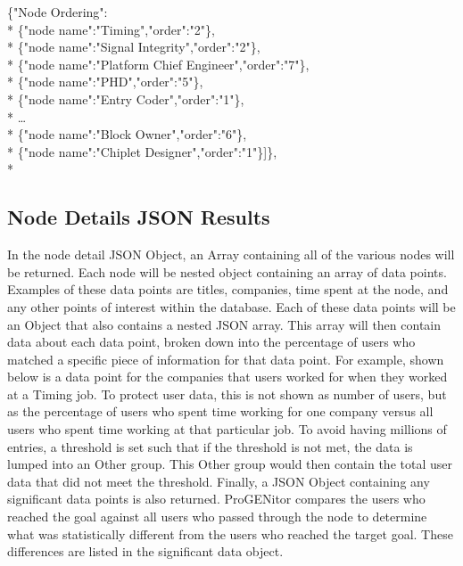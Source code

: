 \noindent \{"Node Ordering":\\*
	\indent\{"node	name":"Timing","order":"2"\},\\*
	\indent\{"node name":"Signal Integrity","order":"2"\},\\*
	\indent\{"node name":"Platform Chief Engineer","order":"7"\},\\*
	\indent\{"node name":"PHD","order":"5"\},\\*
	\indent\{"node name":"Entry Coder","order":"1"\},\\*
	\indent\ldots\\*
	\indent\{"node name":"Block Owner","order":"6"\},\\*
	\indent\{"node name":"Chiplet Designer","order":"1"\}]\},\\*


\subsection{Node Details JSON Results}
In the node detail JSON Object, an Array containing all of the various nodes
will be returned.  Each node will be nested object containing an array of data
points.  Examples of these data points are titles, companies, time spent at the
node, and any other points of interest within the database.  Each of these data
points will be an Object that also contains a nested JSON array.  This array
will then contain data about each data point, broken down into the percentage of
users who matched a specific piece of information for that data point.  For
example, shown below is a data point for the companies that users worked for
when they worked at a Timing job.  To protect user data, this is not shown as
number of users, but as the percentage of users who spent time working for one
company versus all users who spent time working at that particular job.  To
avoid having millions of entries, a threshold is set such that if the threshold
is not met, the data is lumped into an Other group.  This Other group would then
contain the total user data that did not meet the threshold.  Finally, a JSON
Object containing any significant data points is also returned.  ProGENitor
compares the users who reached the goal against all users who passed through the
node to determine what was statistically different from the users who reached
the target goal.  These differences are listed in the significant data object.

